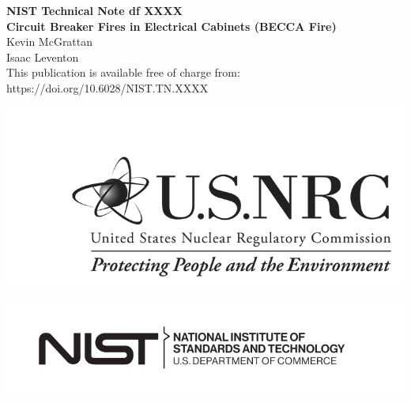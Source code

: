 \documentclass[12pt]{article}
\newcommand{\pubnumber}{XXXX}
\newcommand{\DOI}{https://doi.org/10.6028/NIST.TN.XXXX}
\begin{document}
	
	\begin{titlepage}
		\begin{flushright}
\LARGE{\textbf{NIST Technical Note df \pubnumber}}\\
\vfill
\Huge{\textbf{Circuit \textbf{B}reaker Fires in \textbf{E}lectrical \textbf{C}abinets (BECCA Fire)}}\\
\vfill
\large Kevin McGrattan \\ Isaac Leventon \\
\vfill
\normalsize This publication is available free of charge from:\\
\DOI\\
\vfill

\includegraphics[width=0.5\linewidth]{../FIGURES/NRC_logo} %

\vspace{0.5in}

\includegraphics[width=0.3\linewidth]{../FIGURES/NIST-logo}\\


\end{flushright}
\end{titlepage}
\end{document}
